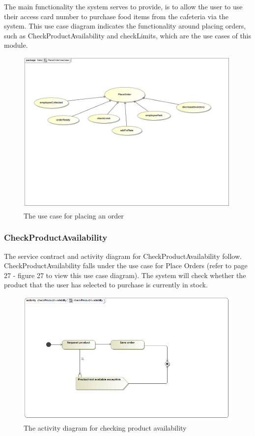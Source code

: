 \documentclass[a4paper,12pt]{report}
\begin{document}
The main functionality the system serves to provide, is  to allow the user to use their access card number to purchase food items from the cafeteria via the system. This use case diagram indicates the functionality around placing orders, such as CheckProductAvailability and checkLimits, which are the use cases of this module.

\begin{figure}[H]
  \centering
    \includegraphics[width=1.0\textwidth]{../images/PlaceOrderUseCase.jpg}
    \caption{The use case for placing an order} 
\end{figure}
 
\subsubsection{CheckProductAvailability}
The service contract and activity diagram for CheckProductAvailability follow. CheckProductAvailability falls under the use case for Place Orders (refer to page 27 - figure 27 to view this use case diagram). The system will check whether the product that the user has selected to purchase is currently in stock.
\begin{figure}[H]
  \centering
    \includegraphics[width=1.0\textwidth]{../images/checkProductAvailability.png}
    \caption{The activity diagram for checking product availability } 
\end{figure}
 
\end{document}
